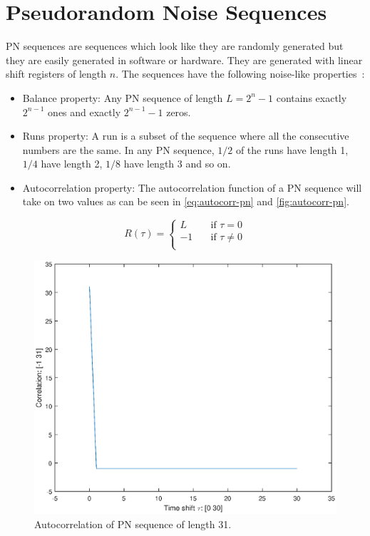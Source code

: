 
\section{Pseudorandom Noise Sequences}
\label{sec:pn-sequences}

PN sequences are sequences which look like they are randomly generated but they are easily generated in software or hardware.
They are generated with linear shift registers of length $n$.
The sequences have the following noise-like properties~\cite{mitra2008pseudo}:

\begin{itemize}
	\item Balance property:	Any PN sequence of length $L = 2^n - 1$ contains exactly $2^{n-1}$ ones and exactly $2^{n-1} - 1$ zeros.

	\item Runs property: A run is a subset of the sequence where all the consecutive numbers are the same. In any PN sequence, $1/2$ of the runs have length 1, $1/4$ have length 2, $1/8$ have length 3 and so on.

	\item Autocorrelation property: The autocorrelation function of a PN sequence will take on two values as can be seen in \autoref{eq:autocorr-pn} and \autoref{fig:autocorr-pn}.


\end{itemize}

\begin{equation}
	\label{eq:autocorr-pn}
	R(\tau) = 
		\begin{cases}
			L    & \quad \text{if } \tau = 0 \\
			-1   & \quad \text{if } \tau \neq 0 \\
		\end{cases}
\end{equation}

\begin{figure}[h]
	\centering
	\includegraphics[width=\textwidth]{chapters/cdma-chapters/autocorr-pn.eps}
	\caption{Autocorrelation of PN sequence of length 31.}
	\label{fig:autocorr-pn}
\end{figure}


